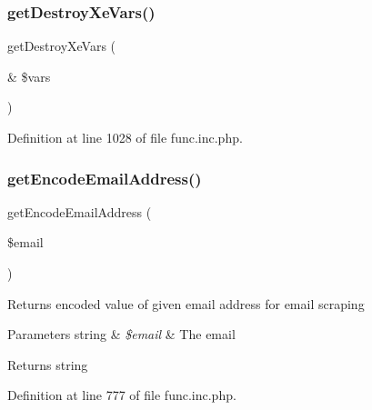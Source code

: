 \hypertarget{func_8inc_8php_a563d33afe37e2b440a2f4500f58eeb64}{}\label{func_8inc_8php_a563d33afe37e2b440a2f4500f58eeb64} 
\subsubsection{\texorpdfstring{get\+Destroy\+Xe\+Vars()}{getDestroyXeVars()}}
{\footnotesize\ttfamily get\+Destroy\+Xe\+Vars (\begin{DoxyParamCaption}\item[{\&}]{\$vars }\end{DoxyParamCaption})}



Definition at line 1028 of file func.\+inc.\+php.

\hypertarget{func_8inc_8php_a3ec2d6f22b5d041d959d1c56967b13ce}{}\label{func_8inc_8php_a3ec2d6f22b5d041d959d1c56967b13ce} 
\subsubsection{\texorpdfstring{get\+Encode\+Email\+Address()}{getEncodeEmailAddress()}}
{\footnotesize\ttfamily get\+Encode\+Email\+Address (\begin{DoxyParamCaption}\item[{}]{\$email }\end{DoxyParamCaption})}

Returns encoded value of given email address for email scraping


\begin{DoxyParams}[1]{Parameters}
string & {\em \$email} & The email \\
\hline
\end{DoxyParams}
\begin{DoxyReturn}{Returns}
string 
\end{DoxyReturn}


Definition at line 777 of file func.\+inc.\+php.

\hypertarget{func_8inc_8php_a778b55fa9ebcf9a5ef0b017b998d9894}{}\label{func_8inc_8php_a778b55fa9ebcf9a5ef0b017b998d9894} 
